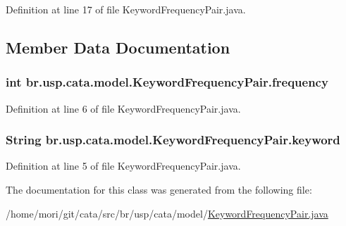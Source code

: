 Definition at line 17 of file Keyword\+Frequency\+Pair.\+java.



\subsection{Member Data Documentation}
\hypertarget{classbr_1_1usp_1_1cata_1_1model_1_1_keyword_frequency_pair_a3c3be681f3c4c4c8acc88ee583055a76}{
\subsubsection[{frequency}]{\setlength{\rightskip}{0pt plus 5cm}int br.\+usp.\+cata.\+model.\+Keyword\+Frequency\+Pair.\+frequency\hspace{0.3cm}{\ttfamily [private]}}}\label{classbr_1_1usp_1_1cata_1_1model_1_1_keyword_frequency_pair_a3c3be681f3c4c4c8acc88ee583055a76}


Definition at line 6 of file Keyword\+Frequency\+Pair.\+java.

\hypertarget{classbr_1_1usp_1_1cata_1_1model_1_1_keyword_frequency_pair_a4cf9aecf7465bbf0e90b2d46526871ea}{
\subsubsection[{keyword}]{\setlength{\rightskip}{0pt plus 5cm}String br.\+usp.\+cata.\+model.\+Keyword\+Frequency\+Pair.\+keyword\hspace{0.3cm}{\ttfamily [private]}}}\label{classbr_1_1usp_1_1cata_1_1model_1_1_keyword_frequency_pair_a4cf9aecf7465bbf0e90b2d46526871ea}


Definition at line 5 of file Keyword\+Frequency\+Pair.\+java.



The documentation for this class was generated from the following file\+:\begin{DoxyCompactItemize}
\item 
/home/mori/git/cata/src/br/usp/cata/model/\hyperlink{_keyword_frequency_pair_8java}{Keyword\+Frequency\+Pair.\+java}\end{DoxyCompactItemize}
